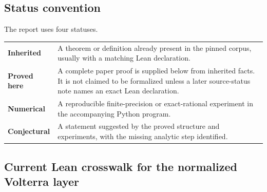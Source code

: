 \documentclass[11pt,oneside]{article}
\theoremstyle{definition}
\theoremstyle{remark}
\newcommand{\1}{\mathbf 1}
\begin{document}
\subsection{Status convention}

The report uses four statuses.

\begin{center}
\begin{tabularx}{0.94\textwidth}{@{}>{\bfseries}lX@{}}
\toprule
Inherited & A theorem or definition already present in the pinned corpus, usually with a
matching Lean declaration.\\
Proved here & A complete paper proof is supplied below from inherited facts.  It is not
claimed to be formalized unless a later source-status note names an exact Lean declaration.\\
Numerical & A reproducible finite-precision or exact-rational experiment in the accompanying
Python program.\\
Conjectural & A statement suggested by the proved structure and experiments, with the missing
analytic step identified.\\
\bottomrule
\end{tabularx}
\end{center}

\subsection{Current Lean crosswalk for the normalized Volterra layer}
\end{document}
